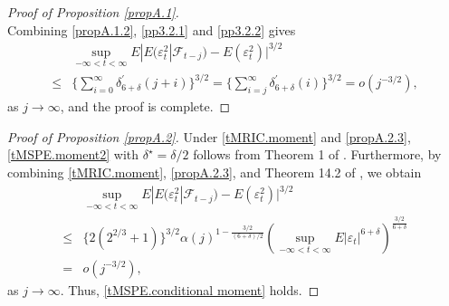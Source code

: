 \documentclass[ejsv2]{imsart}
\theoremstyle{plain}
\theoremstyle{definition}
\theoremstyle{remark}
\begin{document}
{\begin{proof}[Proof of Proposition \ref{propA.1}]
\begin{equation}
\end{equation}
Combining \eqref{propA.1.2}, \eqref{pp3.2.1} and \eqref{pp3.2.2} gives
\begin{equation}\label{pp3.2.3}
\begin{split}
      & \sup\limits_{-\infty<t<\infty} E|E(\varepsilon_t^2|\mathcal{F}_{t-j})-E(\varepsilon_t^2)|^{3/2}\\
    \leq& \{\sum_{i=0}^{\infty}\delta^\prime_{6+\delta}(j+i)\}^{3/2}=\{\sum_{i=j}^{\infty}\delta^\prime_{6+\delta}(i)\}^{3/2} =o(j^{-3/2}),
\end{split}
\end{equation}
as $j\to\infty$, and the proof is complete.
\end{proof}

\begin{proof}[Proof of Proposition \ref{propA.2}]
Under \eqref{tMRIC.moment} and \eqref{propA.2.3}, \eqref{tMSPE.moment2} with $\delta^\star=\delta/2$ follows from Theorem 1 of \cite{Kim1993}. Furthermore, by combining \eqref{tMRIC.moment}, \eqref{propA.2.3}, and Theorem 14.2 of \cite{Davidson1994}, we obtain
\begin{equation}\label{ppA.2.1}
\begin{split}
    & \sup\limits_{-\infty<t<\infty} E|E(\varepsilon_t^2|\mathcal{F}_{t-j})-E(\varepsilon_t^2)|^{3/2} \\
   \leq  & \{2(2^{2/3}+1)\}^{3/2}\alpha(j)^{1-\frac{3/2}{(6+\delta)/2}}(\sup\limits_{-\infty<t<\infty}E|\varepsilon_t|^{6+\delta})^{\frac{3/2}{6+\delta}} \\
    = & o(j^{-3/2}),
\end{split}
\end{equation}
as $j\to\infty$. Thus, \eqref{tMSPE.conditional moment} holds.
\end{proof}}
\end{document}
